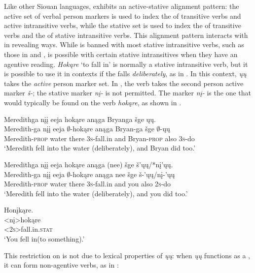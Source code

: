 \documentclass[output=paper]{LSP/langsci}
\begin{document}
Like other Siouan languages,  exhibits an active-stative alignment pattern: the active set of verbal person markers is used to index the  of transitive verbs and active intransitive verbs, while the stative set is used to index the  of transitive verbs and the  of stative intransitive verbs. This alignment pattern interacts with  in revealing ways. While  is banned with most stative intransitive verbs, such as those in  and ,  is possible with certain stative intransitives when they have an agentive reading. \emph{Hokąre} `to fall in' is normally a stative intransitive verb, but it is possible to use it in  contexts if the  falls \emph{deliberately}, as in . In this context, \emph{ųų} takes the \emph{active} person marker set. In , the verb takes the second person active marker \emph{š-}; the stative marker \emph{nį-} is not permitted. The marker \emph{nį-} is the one that would typically be found on the verb \emph{hokąre}, as shown in .
 
\ea\label{ex:johnson:21}
\ea\label{ex:johnson:21a} 
\glll Meredithga nįį eeja hokąre anąga Bryanga šge ųų.\\
Meredith-ga nįį eeja $\emptyset$-hokąre anąga Bryan-ga šge $\emptyset$-ųų\\
Meredith-\textsc{prop} water there \textsc{3s}-fall.in and Bryan-\textsc{prop} also \textsc{3s}-do\\
\trans `Meredith fell into the water (deliberately), and Bryan did too.'
 
\ex\label{ex:johnson:21b} 
\glll Meredithga nįį eeja hokąre anąga (nee) šge š'ųų/*nį'ųų.\\
Meredith-ga nįį eeja $\emptyset$-hokąre anąga nee šge š-'ųų/nį-'ųų\\
Meredith-\textsc{prop} water there \textsc{3s}-fall.in and you also \textsc{2s}-do\\
\trans `Meredith fell into the water (deliberately), and you did too.'
\z
\z
 
\ea\label{ex:johnson:22} 
\glll Honįkąre.\\
<nį>hokąre\\
<\textsc{2s}>fall.in.\textsc{stat}\\
\trans `You fell in(to something).' \citep{Hartmann2012}
\z
	
This restriction on  is not due to lexical properties of \emph{ųų}: when \emph{ųų} functions as a , it can form non-agentive verbs, as in :
\end{document}
